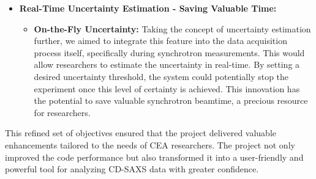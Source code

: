 \begin{itemize}
\begin{itemize}
    \end{itemize}
    \item \textbf{Real-Time Uncertainty Estimation - Saving Valuable Time:}
    \begin{itemize}
        \item \textbf{On-the-Fly Uncertainty:} Taking the concept of uncertainty estimation further, we aimed to integrate this feature into the data acquisition process itself, specifically during synchrotron measurements. This would allow researchers to estimate the uncertainty in real-time. By setting a desired uncertainty threshold, the system could potentially stop the experiment once this level of certainty is achieved. This innovation has the potential to save valuable synchrotron beamtime, a precious resource for researchers.
    \end{itemize}
\end{itemize}

This refined set of objectives ensured that the project delivered valuable enhancements tailored to the needs of CEA researchers. The project not only improved the code performance but also transformed it into a user-friendly and powerful tool for analyzing CD-SAXS data with greater confidence.
